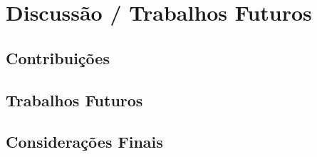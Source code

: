 
\chapter{Discussão / Trabalhos Futuros} %
\label{cha:conclusion}





\section{Contribuições}
\label{sec:contributions}

\section{Trabalhos Futuros}
\label{sec:future-work}






% 

\section{Considerações Finais}
\label{sec:final-considerations}
